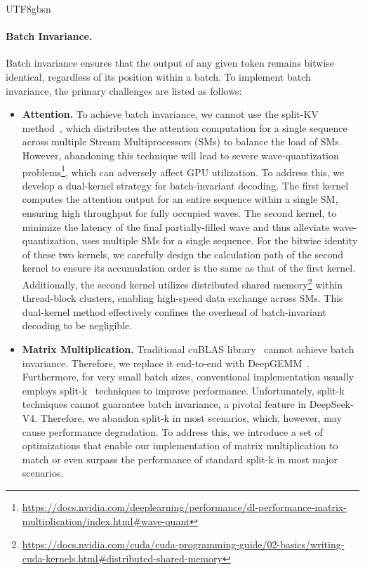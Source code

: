 \documentclass[11pt, a4paper, logo, copyright, nonumbering]{deepseek}
\newcommand{\dsviv}{DeepSeek-V4}
\begin{document}
\begin{CJK*}{UTF8}{gbsn}
\paragraph{Batch Invariance.}
Batch invariance ensures that the output of any given token remains bitwise identical, regardless of its position within a batch.
To implement batch invariance, the primary challenges are listed as follows:
\begin{itemize}[topsep=0pt]
    \item \textbf{Attention.} 
    To achieve batch invariance, we cannot use the split-KV method~\citep{flash_decoding}, which distributes the attention computation for a single sequence across multiple Stream Multiprocessors (SMs) to balance the load of SMs. 
    However, abandoning this technique will lead to severe wave-quantization problems\footnote{\url{https://docs.nvidia.com/deeplearning/performance/dl-performance-matrix-multiplication/index.html\#wave-quant}}, which can adversely affect GPU utilization. 
    To address this, we develop a dual-kernel strategy for batch-invariant decoding. 
    The first kernel computes the attention output for an entire sequence within a single SM, ensuring high throughput for fully occupied waves. 
    The second kernel, to minimize the latency of the final partially-filled wave and thus alleviate wave-quantization, uses multiple SMs for a single sequence. 
    For the bitwise identity of these two kernels, we carefully design the calculation path of the second kernel to ensure its accumulation order is the same as that of the first kernel. 
    Additionally, the second kernel utilizes distributed shared memory\footnote{\url{https://docs.nvidia.com/cuda/cuda-programming-guide/02-basics/writing-cuda-kernels.html\#distributed-shared-memory}} within thread-block clusters, enabling high-speed data exchange across SMs.
    This dual-kernel method effectively confines the overhead of batch-invariant decoding to be negligible.
    
    \item \textbf{Matrix Multiplication.} 
    Traditional cuBLAS library~\citep{cublas} cannot achieve batch invariance. 
    Therefore, we replace it end-to-end with DeepGEMM~\citep{deepgemm2025}. 
    Furthermore, for very small batch sizes, conventional implementation usually employs split-k~\citep{stream_k} techniques to improve performance.
    Unfortunately, split-k techniques cannot guarantee batch invariance, a pivotal feature in \dsviv{}. 
    Therefore, we abandon split-k in most scenarios, which, however, may cause performance degradation.
    To address this, we introduce a set of optimizations that enable our implementation of matrix multiplication to match or even surpass the performance of standard split-k in most major scenarios.
\end{itemize}


\end{CJK*}
\end{document}
